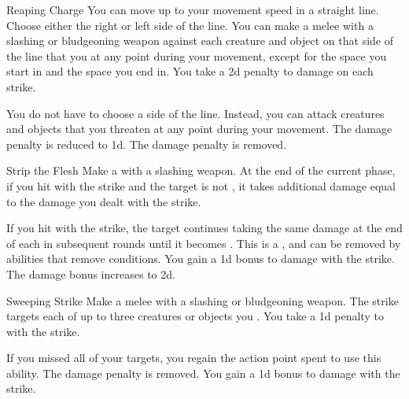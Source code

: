 {            \begin{ability}{Reaping Charge}
                You can move up to your movement speed in a straight line.
                Choose either the right or left side of the line.
                You can make a melee  with a slashing or bludgeoning weapon against each creature and object on that side of the line that you  at any point during your movement, except for the space you start in and the space you end in.
                You take a \minus2d penalty to damage on each strike.

                \rankline
                 You do not have to choose a side of the line.
                Instead, you can attack creatures and objects that you threaten at any point during your movement.
                 The damage penalty is reduced to \minus1d.
                 The damage penalty is removed.
            \end{ability}

            \begin{ability}{Strip the Flesh}
                Make a  with a slashing weapon.
                At the end of the current phase, if you hit with the strike and the target is not , it takes additional damage equal to the damage you dealt with the strike.

                \rankline
                 If you hit with the strike, the target continues taking the same damage at the end of each  in subsequent rounds until it becomes .
                This is a , and can be removed by abilities that remove conditions.
                 You gain a \plus1d bonus to damage with the strike.
                 The damage bonus increases to \plus2d.
            \end{ability}

            \begin{ability}{Sweeping Strike}
                Make a melee  with a slashing or bludgeoning weapon.
                The strike targets each of up to three creatures or objects you .
                You take a \minus1d penalty to  with the strike.

                \rankline
                 If you missed all of your targets, you regain the action point spent to use this ability.
                 The damage penalty is removed.
                 You gain a \plus1d bonus to damage with the strike.
            \end{ability}

}
